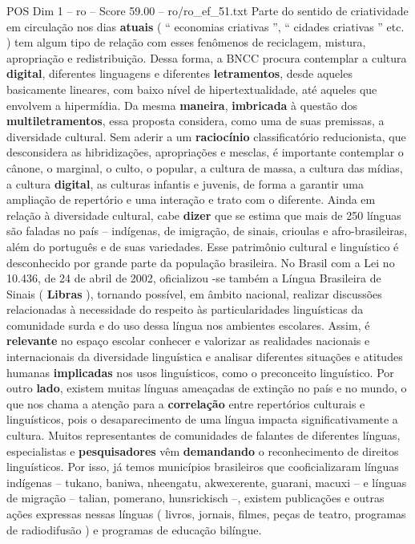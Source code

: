 \begin{textsample}{POS Dim 1 – ro – Score 59.00 – ro/ro\_ef\_51.txt}
Parte do sentido de criatividade em circulação nos dias \textbf{atuais} ( “ economias criativas ”, “ cidades criativas ” etc. ) tem algum tipo de relação com esses fenômenos de reciclagem, mistura, apropriação e redistribuição.
Dessa forma, a BNCC procura contemplar a cultura \textbf{digital}, diferentes linguagens e diferentes \textbf{letramentos}, desde aqueles basicamente lineares, com baixo nível de hipertextualidade, até aqueles que envolvem a hipermídia.
Da mesma \textbf{maneira}, \textbf{imbricada} à questão dos \textbf{multiletramentos}, essa proposta considera, como uma de suas premissas, a diversidade cultural.
Sem aderir a um \textbf{raciocínio} classificatório reducionista, que desconsidera as hibridizações, apropriações e mesclas, é importante contemplar o cânone, o marginal, o culto, o popular, a cultura de massa, a cultura das mídias, a cultura \textbf{digital}, as culturas infantis e juvenis, de forma a garantir uma ampliação de repertório e uma interação e trato com o diferente.
Ainda em relação à diversidade cultural, cabe \textbf{dizer} que se estima que mais de 250 línguas são faladas no país – indígenas, de imigração, de sinais, crioulas e afro-brasileiras, além do português e de suas variedades.
Esse patrimônio cultural e linguístico é desconhecido por grande parte da população brasileira.
No Brasil com a Lei no 10.436, de 24 de abril de 2002, oficializou -se também a Língua Brasileira de Sinais ( \textbf{Libras} ), tornando possível, em âmbito nacional, realizar discussões relacionadas à necessidade do respeito às particularidades linguísticas da comunidade surda e do uso dessa língua nos ambientes escolares.
Assim, é \textbf{relevante} no espaço escolar conhecer e valorizar as realidades nacionais e internacionais da diversidade linguística e analisar diferentes situações e atitudes humanas \textbf{implicadas} nos usos linguísticos, como o preconceito linguístico.
Por outro \textbf{lado}, existem muitas línguas ameaçadas de extinção no país e no mundo, o que nos chama a atenção para a \textbf{correlação} entre repertórios culturais e linguísticos, pois o desaparecimento de uma língua impacta significativamente a cultura.
Muitos representantes de comunidades de falantes de diferentes línguas, especialistas e \textbf{pesquisadores} vêm \textbf{demandando} o reconhecimento de direitos linguísticos.
Por isso, já temos municípios brasileiros que cooficializaram línguas indígenas – tukano, baniwa, nheengatu, akwexerente, guarani, macuxi – e línguas de migração – talian, pomerano, hunsrickisch –, existem publicações e outras ações expressas nessas línguas ( livros, jornais, filmes, peças de teatro, programas de radiodifusão ) e programas de educação bilíngue.

\end{textsample}
